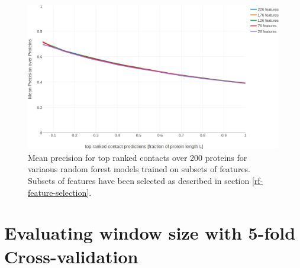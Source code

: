 \documentclass[11pt,a4paper,twoside]{book}
\theoremstyle{definition}
\theoremstyle{definition}
\theoremstyle{remark}
\begin{document}
\begin{figure}

{\centering \includegraphics[width=1\linewidth]{img/random_forest_contact_prior/additional_contat_score_features/precision_vs_rank_featureselection_random_forest_nestimators1000_maxfeatures03_maxdepth100_minsamplesleaf10_pLLfeature} 

}

\caption{Mean precision for top
ranked contacts over 200 proteins for variaous random forest models
trained on subsets of features. Subsets of features have been selected
as described in section \ref{rf-feature-selection}.}\label{fig:feature-selection-rf-with-pll-score}
\end{figure}

\section{Evaluating window size with 5-fold
Cross-validation}\label{rf-window-size}
\end{document}
